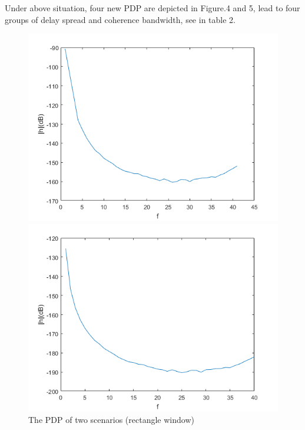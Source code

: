 \documentclass[a4paper]{article}
\begin{document}
	Under above situation, four new PDP are depicted in  Figure.4 and 5, lead to four groups of delay spread and coherence bandwidth, see in table 2. 
	\begin{figure}[hbtp]
		\begin{minipage}[t]{0.5\linewidth}
			\centering
			\includegraphics[scale=0.5]{lab1/PDP_LOS_rec.png}
			\vspace{-0.5cm}
			\centering
		\end{minipage}
		\begin{minipage}[t]{0.5\linewidth}
			\centering
			\includegraphics[scale=0.5]{lab1/PDP_NLOS_rec.png}
			\vspace{-0.5cm}
			\centering
		\end{minipage}
		\caption{The PDP of two scenarios (rectangle window)}
        \label{fig:rec_win_PDP}
	\end{figure}
\end{document}
